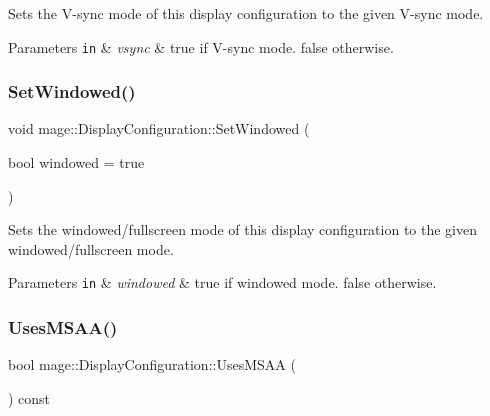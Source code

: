 Sets the V-\/sync mode of this display configuration to the given V-\/sync mode.


\begin{DoxyParams}[1]{Parameters}
\mbox{\tt in}  & {\em vsync} & {\ttfamily true} if V-\/sync mode. {\ttfamily false} otherwise. \\
\hline
\end{DoxyParams}
\hypertarget{structmage_1_1_display_configuration_ac6228139b3fae3b5fb454aa072b94efd}{}\label{structmage_1_1_display_configuration_ac6228139b3fae3b5fb454aa072b94efd} 
\subsubsection{\texorpdfstring{Set\+Windowed()}{SetWindowed()}}
{\footnotesize\ttfamily void mage\+::\+Display\+Configuration\+::\+Set\+Windowed (\begin{DoxyParamCaption}\item[{bool}]{windowed = {\ttfamily true} }\end{DoxyParamCaption})\hspace{0.3cm}{\ttfamily [noexcept]}}

Sets the windowed/fullscreen mode of this display configuration to the given windowed/fullscreen mode.


\begin{DoxyParams}[1]{Parameters}
\mbox{\tt in}  & {\em windowed} & {\ttfamily true} if windowed mode. {\ttfamily false} otherwise. \\
\hline
\end{DoxyParams}
\hypertarget{structmage_1_1_display_configuration_a86de1a4b64811fce0d5b365924cd2558}{}\label{structmage_1_1_display_configuration_a86de1a4b64811fce0d5b365924cd2558} 
\subsubsection{\texorpdfstring{Uses\+M\+S\+A\+A()}{UsesMSAA()}}
{\footnotesize\ttfamily bool mage\+::\+Display\+Configuration\+::\+Uses\+M\+S\+AA (\begin{DoxyParamCaption}{ }\end{DoxyParamCaption}) const\hspace{0.3cm}{\ttfamily [noexcept]}}

